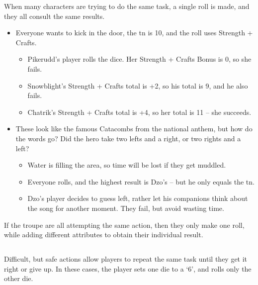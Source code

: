 \begin{multicols}{2}
When many characters are trying to do the same task, a single roll is made, and they all consult the same results.

\begin{exampletext}
\begin{itemize}
  \item
  Everyone wants to kick in the door, the \gls{tn} is 10, and the roll uses Strength + Crafts.
    \begin{itemize}
    \item
    Pikerudd's player rolls the dice. Her Strength + Crafts Bonus is 0, so she fails.
    \item
    Snowblight's Strength + Crafts total is +2, so his total is 9, and he also fails.
    \item
    Chatrik's Strength + Crafts total is +4, so her total is 11 -- she succeeds.
    \end{itemize}
  \item
  These look like the famous Catacombs from the national anthem, but how do the words go?
  Did the hero take two lefts and a right, or two rights and a left?
    \begin{itemize}
    \item
    Water is filling the area, so time will be lost if they get muddled.
    \item
    Everyone rolls, and the highest result is Dzo's -- but he only equals the \gls{tn}.
    \item
    Dzo's player decides to guess left, rather let his companions think about the song for another moment.
    They fail, but avoid wasting time.
    \end{itemize}
\end{itemize}

\end{exampletext}

If the troupe are all attempting the same action, then they only make one roll, while adding different attributes to obtain their individual result.

\subsection{}\label{restingactions}

Difficult, but safe actions allow players to repeat the same task until they get it right or give up.
In these cases, the player sets one die to a `6', and rolls only the other die.


\end{multicols}
